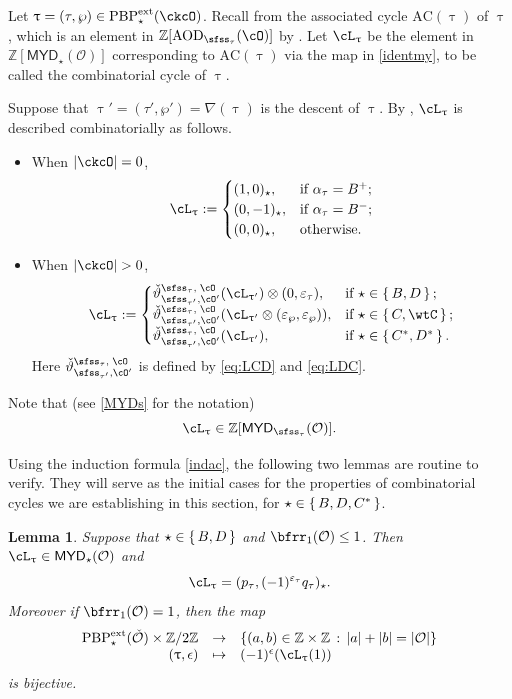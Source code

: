 \documentclass[11pt,a4paper]{amsart}
\newcommand{\AC}{\mathrm{AC}}
\def\MYD{{\mathsf{MYD}}}
\def\abs#1{\left|{#1}\right|}
\newcommand{\CO}{{\mathcal {O}}}
\newcommand{\Z}{\mathbb{Z}}
\newcommand{\be}{\begin {equation}}
\newcommand{\ee}{\end {equation}}
\numberwithin{equation}{section}
\newtheorem{lem}[thm]{Lemma}
\theoremstyle{remark}
\def\PBPes{\mathrm{PBP}^{\mathrm{ext}}_{\star}}
\def\uptaup{\uptau^{\prime}}
\def\MYD{{\mathsf{MYD}}}
\def\AOD{\mathrm{AOD}}
\def\AC{\mathrm{AC}}
\def\ac{\cL}
\def\lotimes{\otimes}
\begin{document}
Let  $\uptau=(\tau,\wp)\in \PBPes(\ckcO)$. Recall from 
the associated cycle $\AC(\uptau)$ of $\uptau$, which is an element in
$\Z[\AOD_{\sfss_\tau }(\cO)]$
by .
Let $\ac_{\uptau}$ be the element in $\Z[\MYD_{\star}(\CO)]$ corresponding to $\AC(\uptau)$ via the map in \eqref{identmy}, to be called the combinatorial cycle of $\uptau$.

 Suppose that $\uptau'=(\tau',\wp')=\nabla(\uptau)$ is the descent of $\uptau$. By , $\ac_{\uptau}$  is
described  combinatorially as follows.
\begin{itemize}
\item
When $\abs{\ckcO}=0$,
\[
  \ac_{\uptau} :=
  \begin{cases}
   (1,0)_{\star}, & \text{if } \alpha_\tau=B^+;\\
   (0,-1)_{\star}, & \text{if } \alpha_\tau=B^-;\\
   (0,0)_{\star}, & \text{otherwise}.
  \end{cases}
\]
\item
When $\abs{\ckcO} >0$,
\be\label{indac}
\ac_{\uptau} :=
\begin{cases}
  \dlifttso(\ac_{\uptaup})\lotimes (0,\varepsilon_{\tau}),
  & \text{if } \star \in \set{B,D}; \\
  \dlifttso(\ac_{\uptaup}\lotimes (\varepsilon_{\wp},\varepsilon_{\wp})),
  & \text{if } \star\in \set{C,\wtC};\\
  \dlifttso(\ac_{\uptaup}),
  & \text{if } \star \in \set{C^*,D^{*}}. \\
\end{cases}
\ee
Here $\dlifttso$ is defined by \eqref{eq:LCD} and \eqref{eq:LDC}.
\end{itemize}

Note that (see \eqref{MYDs} for the notation)
\be\label{signactau}
\ac_\uptau\in \Z[\MYD_{\sfss_{\tau}}(\CO)].
\ee

Using %
the induction formula \eqref{indac}, the following two lemmas are routine to verify.
They will serve as the initial cases for the properties of combinatorial cycles we are establishing in this section, for $\star \in \set{B,D,C^*}$.

\begin{lem}\label{eqtail2}
Suppose that $\star \in \set{B,D}$ and $\bfrr_1(\CO)\leq 1$. Then $\ac_{\uptau}\in \MYD_\star(\CO)$ and
\[
  \ac_\uptau=
    (p_\tau, (-1)^{\varepsilon_\tau} q_\tau)_\star.
\]
Moreover if $\bfrr_1(\CO) =1$, then the map
\[
\begin{array}{rcl}
\PBPes(\check \CO)\times \Z/2\Z &\rightarrow &
\{(a,b)\in\Z\times \Z\,:\, \abs{a}+\abs{b}=\abs{\CO}\} \\
(\uptau,\epsilon)&\mapsto & (-1)^{\epsilon}(\ac_\uptau(1))
\end{array}
\]
is bijective. %

\end{lem}
\end{document}
